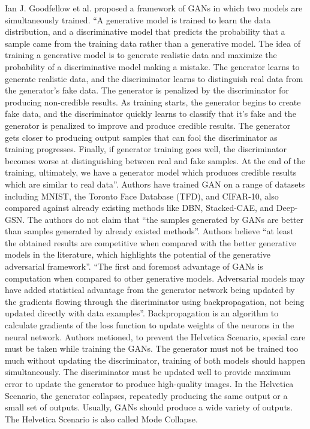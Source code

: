 Ian J. Goodfellow et al.\cite{goodfellow2014generative} proposed a framework of \acp{GAN} in which two models are simultaneously trained. ``A generative model is trained to learn the data distribution, and a discriminative model that predicts the probability that a sample came from the training data rather than a generative model. The idea of training a generative model is to generate realistic data and maximize the probability of a discriminative model making a mistake. The generator learns to generate realistic data, and the discriminator learns to distinguish real data from the generator's fake data. The generator is penalized by the discriminator for producing non-credible results. As training starts, the generator begins to create fake data, and the discriminator quickly learns to classify that it's fake and the generator is penalized to improve and produce credible results. The generator gets closer to producing output samples that can fool the discriminator as training progresses. Finally, if generator training goes well, the discriminator becomes worse at distinguishing between real and fake samples.  At the end of the training, ultimately, we have a generator model which produces credible results which are similar to real data''\cite{goodfellow2014generative}. Authors have trained \ac{GAN} on a range of datasets including MNIST\cite{726791}, the Toronto Face Database (TFD)\cite{susskind2010toronto}, and CIFAR-10\cite{krizhevsky2009learning}, also compared against already existing methods like \ac{DBN}\cite{bengio2012better}, \ac{Stacked-CAE}\cite{bengio2012better}, and \ac{Deep-GSN}\cite{bengio2014deep}. The authors do not claim that ``the samples generated by \acp{GAN} are better than samples generated by already existed methods''\cite{goodfellow2014generative}. Authors believe ``at least the obtained results are competitive when compared with the better generative models in the literature, which highlights the potential of the generative adversarial framework''\cite{goodfellow2014generative}. ``The first and foremost advantage of \acp{GAN} is computation when compared to other generative models. Adversarial models may have added statistical advantage from the generator network being updated by the gradients flowing through the discriminator using backpropagation, not being updated directly with data examples''\cite{goodfellow2014generative}. Backpropagation is an algorithm to calculate gradients of the loss function to update weights of the neurons in the neural network\cite{goodfellow2017deep}. Authors metioned, to prevent the Helvetica Scenario\cite{manisha2019generative}, special care must be taken while training the \acp{GAN}. The generator must not be trained too much without updating the discriminator, training of both models should happen simultaneously. The discriminator must be updated well to provide maximum error to update the generator to produce high-quality images. In the Helvetica Scenario, the generator collapses, repeatedly producing the same output or a small set of outputs. Usually, \acp{GAN} should produce a wide variety of outputs. The Helvetica Scenario is also called Mode Collapse\cite{thanhtung2020catastrophic}.

